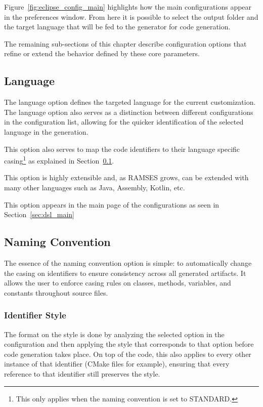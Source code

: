 Figure~\ref{fig:eclipse_config_main} highlights how the main configurations appear in the preferences window. From here it is possible to select the output folder and the target language that will be fed to the generator for code generation.

The remaining sub-sections of this chapter describe configuration options that refine or extend the behavior defined by these core parameters.

\subsection{Language}
\label{sec:dsl_lang}

The language option defines the targeted language for the current customization. The language option also serves as a distinction between different configurations in the configuration list, allowing for the quicker identification of the selected language in the generation.

This option also serves to map the code \glspl{identifier} to their language specific casing\footnote{This only applies when the naming convention is set to STANDARD.} as explained in Section~\ref{sec:dsl_lang}.

This option is highly extensible and, as \gls{RAMSES} grows, can be extended with many other languages such as Java, Assembly, Kotlin, etc.

This option appears in the main page of the configurations as seen in Section~\ref{sec:dsl_main}

\subsection{Naming Convention}
\label{sec:dsl_name}

The essence of the naming convention option is simple: to automatically change the casing on \glspl{identifier} to ensure consistency across all generated artifacts. It allows the user to enforce casing rules on classes, methods, variables, and constants throughout source files.

\subsubsection{Identifier Style}
\label{sec:dsl_name_style}

The format on the style is done by analyzing the selected option in the configuration and then applying the style that corresponds to that option before code generation takes place. On top of the code, this also applies to every other instance of that identifier (CMake files for example), ensuring that every reference to that \gls{identifier} still preserves the style.

